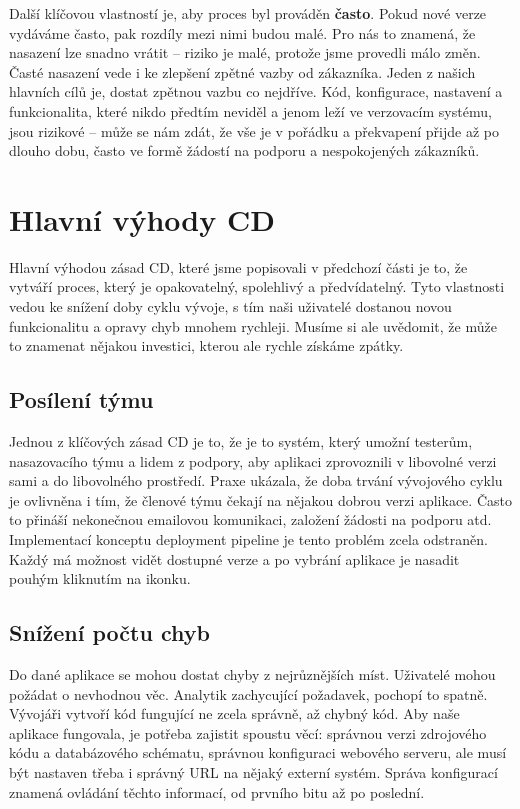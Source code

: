 Další klíčovou vlastností je, aby proces byl prováděn \textbf{často}. Pokud nové verze vydáváme často, pak rozdíly mezi nimi budou malé. Pro nás to znamená, že nasazení lze snadno vrátit -- riziko je malé, protože jsme provedli málo změn. Časté nasazení vede i ke zlepšení zpětné vazby od zákazníka. Jeden z našich hlavních cílů je, dostat zpětnou vazbu co nejdříve. Kód, konfigurace, nastavení a funkcionalita, které nikdo předtím neviděl a jenom leží ve verzovacím systému, jsou rizikové -- může se nám zdát, že vše je v pořádku a překvapení přijde až po dlouho dobu, často ve formě žádostí na podporu a nespokojených zákazníků.

\section{Hlavní výhody CD}
Hlavní výhodou zásad CD, které jsme popisovali v předchozí části je to, že vytváří proces, který je opakovatelný, spolehlivý a předvídatelný. Tyto vlastnosti vedou ke snížení doby cyklu vývoje, s tím naši uživatelé dostanou novou funkcionalitu a opravy chyb mnohem rychleji. Musíme si ale uvědomit, že může to znamenat nějakou investici, kterou ale rychle získáme zpátky.

\subsection{Posílení týmu}
Jednou z klíčových zásad CD je to, že je to systém, který umožní testerům, nasazovacího týmu a lidem z podpory, aby aplikaci zprovoznili v libovolné verzi sami a do libovolného prostředí. Praxe ukázala, že doba trvání vývojového cyklu je ovlivněna i tím, že členové týmu čekají na nějakou dobrou verzi aplikace. Často to přináší nekonečnou emailovou komunikaci, založení žádosti na podporu atd. Implementací konceptu deployment pipeline je tento problém zcela odstraněn. Každý má možnost vidět dostupné verze a po vybrání aplikace je nasadit pouhým kliknutím na ikonku.

\subsection{Snížení počtu chyb}
Do dané aplikace se mohou dostat chyby z nejrůznějších míst. Uživatelé mohou požádat o nevhodnou věc. Analytik zachycující požadavek, pochopí to spatně. Vývojáři vytvoří kód fungující ne zcela správně, až chybný kód. 
Aby naše aplikace fungovala, je potřeba zajistit spoustu věcí: správnou verzi zdrojového kódu a databázového schématu, správnou konfiguraci webového serveru, ale musí být nastaven třeba i správný URL na nějaký externí systém. Správa konfigurací znamená ovládání těchto informací, od prvního bitu až po poslední.

